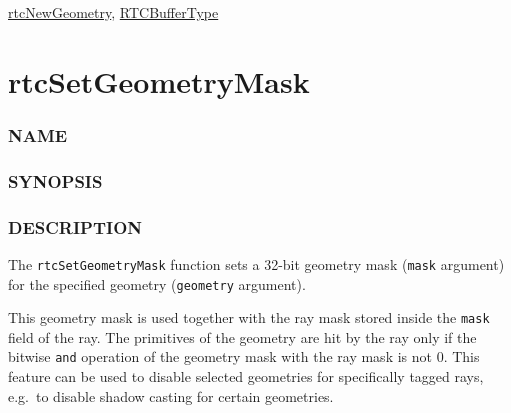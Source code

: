 \hyperref[rtcnewgeometry]{rtcNewGeometry},
\hyperref[rtcbuffertype]{RTCBufferType}

\pagebreak

\section{rtcSetGeometryMask}\label{rtcsetgeometrymask}

\subsubsection{NAME}\label{name}

\begin{Shaded}
\begin{Highlighting}[]
\OperatorTok{{-}}
\end{Highlighting}
\end{Shaded}

\subsubsection{SYNOPSIS}\label{synopsis}

\begin{Shaded}
\begin{Highlighting}[]

\OperatorTok{(}
\OperatorTok{,}
   
\OperatorTok{);}
\end{Highlighting}
\end{Shaded}

\subsubsection{DESCRIPTION}\label{description}

The \texttt{rtcSetGeometryMask} function sets a 32-bit geometry mask
(\texttt{mask} argument) for the specified geometry (\texttt{geometry}
argument).

This geometry mask is used together with the ray mask stored inside the
\texttt{mask} field of the ray. The primitives of the geometry are hit
by the ray only if the bitwise \texttt{and} operation of the geometry
mask with the ray mask is not 0. This feature can be used to disable
selected geometries for specifically tagged rays, e.g.~to disable shadow
casting for certain geometries.

